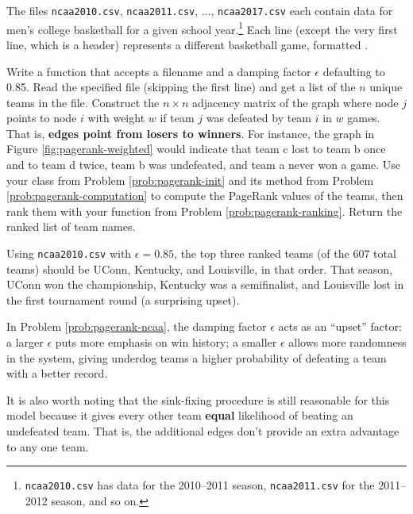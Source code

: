 \begin{problem} %
The files \texttt{ncaa2010.csv}, \texttt{ncaa2011.csv}, $\ldots$, \texttt{ncaa2017.csv} each contain data for men's college basketball for a given school year.\footnote{\texttt{ncaa2010.csv} has data for the 2010--2011 season, \texttt{ncaa2011.csv} for the 2011--2012 season, and so on.}
Each line (except the very first line, which is a header) represents a different basketball game, formatted .%

Write a function that accepts a filename and a damping factor $\epsilon$ defaulting to 0.85.
Read the specified file (skipping the first line) and get a list of the $n$ unique teams in the file.
Construct the $n\times n$ adjacency matrix of the graph where node $j$ points to node $i$ with weight $w$ if team $j$ was defeated by team $i$ in $w$ games.
That is, \textbf{edges point from losers to winners}.
For instance, the graph in Figure \ref{fig:pagerank-weighted} would indicate that team c lost to team b once and to team d twice, team b was undefeated, and team a never won a game.
Use your class from Problem \ref{prob:pagerank-init} and its  method from Problem \ref{prob:pagerank-computation} to compute the PageRank values of the teams, then rank them with your function from Problem \ref{prob:pagerank-ranking}.
Return the ranked list of team names.

Using \texttt{ncaa2010.csv} with $\epsilon=0.85$, the top three ranked teams (of the $607$ total teams) should be UConn, Kentucky, and Louisville, in that order.
That season, UConn won the championship, Kentucky was a semifinalist, and Louisville lost in the first tournament round (a surprising upset).
\label{prob:pagerank-ncaa}
\end{problem}

\begin{info}
In Problem \ref{prob:pagerank-ncaa}, the damping factor $\epsilon$ acts as an ``upset'' factor: a larger $\epsilon$ puts more emphasis on win history; a smaller $\epsilon$ allows more randomness in the system, giving underdog teams a higher probability of defeating a team with a better record.

It is also worth noting that the sink-fixing procedure is still reasonable for this model because it gives every other team \textbf{equal} likelihood of beating an undefeated team.
That is, the additional edges don't provide an extra advantage to any one team.
\end{info}

